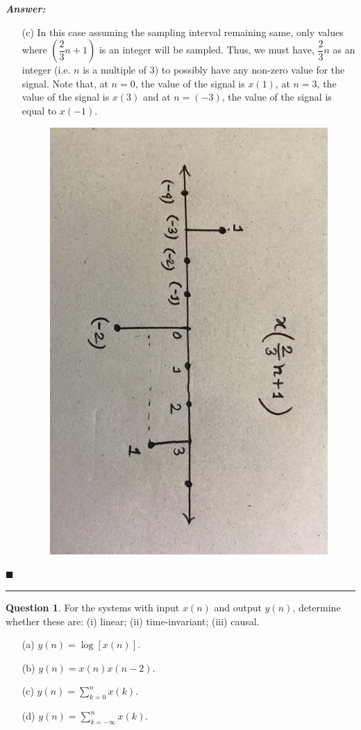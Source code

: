 \documentclass[12pt]{article}
\theoremstyle{definition}
\newtheorem{question}{Question}
\newenvironment{answer}{
    \textbf{\textit{Answer:}} \qquad
}{\hfill $\blacksquare$ \\ \begin{center}
    \rule{0.6\linewidth}{0.5px}    
\end{center}
}
\begin{document}
\begin{answer}
\begin{enumerate}
\begin{figure}[H]
        \end{figure}  
        \item[(c)] In this case assuming the sampling interval remaining same, only values where $\left( \dfrac{2}{3}n + 1\right)$ is an integer will be sampled. Thus, we must have, $\dfrac{2}{3}n$ as an integer (i.e. $n$ is a multiple of $3$) to possibly have any non-zero value for the signal. Note that, at $n = 0$, the value of the signal is $x(1)$, at $n = 3$, the value of the signal is $x(3)$ and at $n = (-3)$, the value of the signal is equal to $x(-1)$. 
        \begin{figure}[H]
            \centering
            \includegraphics[height = 0.5\linewidth, angle = 90]{q3_c.jpeg}
        \end{figure}   
    \end{enumerate}
\end{answer}

\begin{question}
    For the systems with input $x(n)$ and output $y(n)$, determine whether these are: (i) linear; (ii) time-invariant; (iii) causal.
    \begin{enumerate}
        \item[(a)] $y(n) = \log[x(n)]$.
        \item[(b)] $y(n) = x(n)x(n-2)$.
        \item[(c)] $y(n) = \sum_{k=0}^n x(k)$.
        \item[(d)] $y(n) = \sum_{k = -\infty}^n x(k)$.   
    \end{enumerate}
\end{question}
\end{document}
